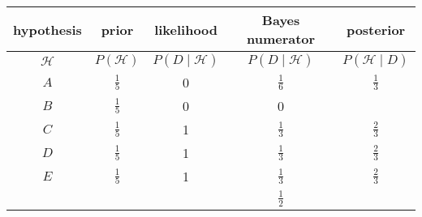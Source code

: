 \documentclass[a5paper,11pt]{article}
\begin{document}
\begin{center}
\begin{tabular}{ | c | c | c | c  | c | }
    \hline
    hypothesis & prior & likelihood & Bayes numerator & posterior\\ \hline
    $\mathcal{H}$ & $P\left(\mathcal{H}\right)$ & $P\left(D \mid \mathcal{H}\right)$ & $P\left(D \mid \mathcal{H} \right)$ & $P\left(\mathcal{H} \mid D \right)$ \\ \hline
    $A$ & $\frac{1}{5}$ & 0 & $\frac{1}{6}$  & $\frac{1}{3}$ \\ \hline
    $B$ & $\frac{1}{5}$ & 0           & 0   &  \\ \hline
    $C$ & $\frac{1}{5}$ & 1 & $\frac{1}{3}$& $\frac{2}{3}$ \\ \hline
    $D$ & $\frac{1}{5}$ & 1 & $\frac{1}{3}$& $\frac{2}{3}$ \\ \hline
    $E$ & $\frac{1}{5}$ & 1 & $\frac{1}{3}$& $\frac{2}{3}$ \\ \hline
    &  &  & $\frac{1}{2}$ &  \\ \hline
  \end{tabular}
\end{center}


\printbibliography{}
\end{document}

